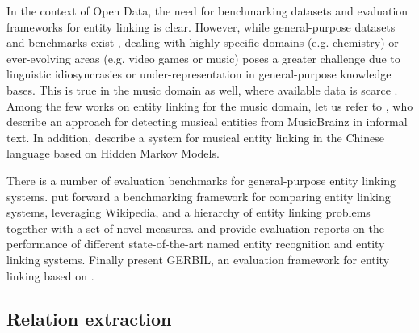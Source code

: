 In the context of Open Data, the need for benchmarking datasets and evaluation frameworks for entity linking is clear. However, while general-purpose datasets and benchmarks exist \citep{Usbeck2015}, dealing with highly specific domains (e.g. chemistry) or ever-evolving areas (e.g. video games or music) poses a greater challenge due to linguistic idiosyncrasies or under-representation in general-purpose knowledge bases. This is true in the music domain as well, where available data is scarce \citep{Pereira2014}. %
Among the few works on entity linking for the music domain, let us refer to \cite{Gruhl2009}, who describe an approach for detecting musical entities from MusicBrainz in informal text. In addition, \cite{Zhang2009} describe a system for musical entity linking in the Chinese language based on Hidden Markov Models. 

There is a number of evaluation benchmarks for general-purpose entity linking systems. \citep{Cornolti2013} put forward a benchmarking framework for comparing entity linking systems, leveraging Wikipedia, and a hierarchy of entity linking problems together with a set of novel measures. \citep{Rizzo2014} and \citep{Gangemi2013} provide evaluation reports on the performance of different state-of-the-art named entity recognition and entity linking systems. Finally \citep{Usbeck2015} present GERBIL, an evaluation framework for entity linking based on \citep{Cornolti2013}.


\subsection{Relation extraction}
\label{sec:SOA:nlu:relation_extraction}


